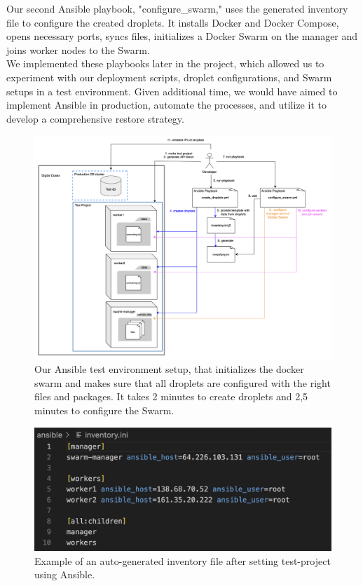 Our second Ansible playbook, "configure\_swarm," uses the generated inventory file to configure the created droplets. It installs Docker and Docker Compose, opens necessary ports, syncs files, initializes a Docker Swarm on the manager and joins worker nodes to the Swarm.\\

We implemented these playbooks later in the project, which allowed us to experiment with our deployment scripts, droplet configurations, and Swarm setups in a test environment. Given additional time, we would have aimed to implement Ansible in production, automate the processes, and utilize it to develop a comprehensive restore strategy.

\begin{figure}[H]
  \centering
  \includegraphics[width=\textwidth]{Images/ansible_setup.png}
  \caption{Our Ansible test environment setup, that initializes the docker swarm and makes sure that all droplets are configured with the right files and packages. It takes 2 minutes to create droplets and 2,5 minutes to configure the Swarm.}
  \label{fig:dashboard}
\end{figure}

\begin{figure}[H]
  \centering
  \includegraphics[width=\textwidth]{Images/ansible_inventory_file.png}
  \caption{Example of an auto-generated inventory file after setting test-project using Ansible.}
  \label{fig:dashboard}
\end{figure}

